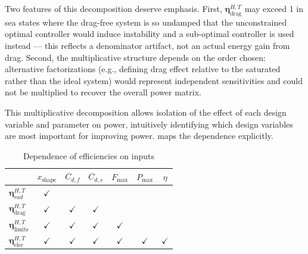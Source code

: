 \documentclass[a4paper,fleqn,colorlinks,unicode,lineno]{cas-dc} %
\makeatletter
\providecommand{\DIFaddtex}[1]{{\protect\color{blue}\uwave{#1}}} %
\providecommand{\DIFdeltex}[1]{{\protect\color{red}\sout{#1}}} %
\providecommand{\DIFaddFL}[1]{\DIFadd{#1}} %
\providecommand{\DIFdelFL}[1]{\DIFdel{#1}} %
\providecommand{\DIFaddbeginFL}{} %
\providecommand{\DIFaddendFL}{} %
\providecommand{\DIFdelbeginFL}{} %
\providecommand{\DIFdelendFL}{} %
\providecommand{\DIFadd}[1]{\texorpdfstring{\DIFaddtex{#1}}{#1}} %
\providecommand{\DIFdel}[1]{\texorpdfstring{\DIFdeltex{#1}}{}} %
\providecommand{\DIFscaledelfig}{0.5}
\newlength{\DIFdelgraphicswidth} %
\newlength{\DIFdelgraphicsheight} %
\providecommand{\DIFaddincludegraphics}[2][]{{\color{blue}\fbox{\DIFOincludegraphics[#1]{#2}}}} %
\providecommand{\DIFdelincludegraphics}[2][]{%
\sbox{\DIFdelgraphicsbox}{\DIFOincludegraphics[#1]{#2}}%
\settoboxwidth{\DIFdelgraphicswidth}{\DIFdelgraphicsbox} %
\settoboxtotalheight{\DIFdelgraphicsheight}{\DIFdelgraphicsbox} %
\scalebox{\DIFscaledelfig}{%
\parbox[b]{\DIFdelgraphicswidth}{\usebox{\DIFdelgraphicsbox}\\[-\baselineskip] \rule{\DIFdelgraphicswidth}{0em}}\llap{\resizebox{\DIFdelgraphicswidth}{\DIFdelgraphicsheight}{%
\setlength{\unitlength}{\DIFdelgraphicswidth}%
\begin{picture}(1,1)%
\thicklines\linethickness{2pt} %
{\color[rgb]{1,0,0}\put(0,0){\framebox(1,1){}}}%
{\color[rgb]{1,0,0}\put(0,0){\line( 1,1){1}}}%
{\color[rgb]{1,0,0}\put(0,1){\line(1,-1){1}}}%
\end{picture}%
}\hspace*{3pt}}} %
} %
\DeclareRobustCommand{\DIFaddbeginFL}{\DIFOaddbeginFL \let\includegraphics\DIFaddincludegraphics} %
\DeclareRobustCommand{\DIFaddendFL}{\DIFOaddendFL \let\includegraphics\DIFOincludegraphics} %
\DeclareRobustCommand{\DIFdelbeginFL}{\DIFOdelbeginFL \let\includegraphics\DIFdelincludegraphics} %
\DeclareRobustCommand{\DIFdelendFL}{\DIFOaddendFL \let\includegraphics\DIFOincludegraphics} %
\let\sout@orig\sout %
\renewcommand{\sout}[1]{\ifmmode\text{\sout@orig{\ensuremath{#1}}}\else\sout@orig{#1}\fi} %
\makeatother
\begin{document}
\ifdefined\DISSERTATION
    Two features of this decomposition deserve emphasis.
    First, $\mathbf{\eta}^{H,T}_{\text{drag}}$ may exceed 1 in sea states where the drag-free system is so undamped that the unconstrained optimal controller would induce instability and a sub-optimal controller is used instead --- this reflects a denominator artifact, not an actual energy gain from drag.
    Second, the multiplicative structure depends on the order chosen: alternative factorizations (e.g., defining drag effect relative to the saturated rather than the ideal system) would represent independent sensitivities and could not be multiplied to recover the overall power matrix.
\fi


This multiplicative decomposition allows isolation of the effect of each design variable and parameter on power, intuitively identifying which design variables are most important for improving power.
 maps the dependence explicitly.
{
\renewcommand{\arraystretch}{1.35}
\begin{table}[h]
\centering
\caption{Dependence of efficiencies on inputs}\label{tab:power-matrix-dependence}
\begin{tabular}{lcccccc}
\hline
 & $x_{\text{shape}}$ & \DIFdelbeginFL \DIFdelFL{$C_{d,f}$ }\DIFdelendFL \DIFaddbeginFL \DIFaddFL{$\gls{sym-C-d-f}$ }\DIFaddendFL & \DIFdelbeginFL \DIFdelFL{$C_{d,s}$ }\DIFdelendFL \DIFaddbeginFL \DIFaddFL{$\gls{sym-C-d-s}$ }\DIFaddendFL & \DIFdelbeginFL \DIFdelFL{$F_{\text{max}}$ }\DIFdelendFL \DIFaddbeginFL \DIFaddFL{$\gls{sym-F-max}$ }\DIFaddendFL & \DIFdelbeginFL \DIFdelFL{$P_{\text{max}}$ }\DIFdelendFL \DIFaddbeginFL \DIFaddFL{$\gls{sym-P-max}$ }\DIFaddendFL & \DIFdelbeginFL \DIFdelFL{$\eta$ }\DIFdelendFL \DIFaddbeginFL \DIFaddFL{$\gls{sym-eta}$ }\DIFaddendFL \\
\hline
\DIFdelbeginFL \DIFdelFL{$\mathbf{\eta}^{H,T}_{rad}$   }\DIFdelendFL \DIFaddbeginFL \DIFaddFL{$\gls{sym-boldsymbol-eta-H-T-rad}$   }\DIFaddendFL & $\checkmark$ &  &  &  &  &  \\
\DIFdelbeginFL \DIFdelFL{$\mathbf{\eta}^{H,T}_{\text{drag}}$  }\DIFdelendFL \DIFaddbeginFL \DIFaddFL{$\gls{sym-boldsymbol-eta-H-T-drag}$  }\DIFaddendFL & $\checkmark$ & $\checkmark$ & $\checkmark$ &  &  &  \\
\DIFdelbeginFL \DIFdelFL{$\mathbf{\eta}^{H,T}_{\text{limits}}$ }\DIFdelendFL \DIFaddbeginFL \DIFaddFL{$\gls{sym-boldsymbol-eta-H-T-limits}$ }\DIFaddendFL & $\checkmark$ & $\checkmark$ & $\checkmark$ & $\checkmark$ &  &  \\
\DIFdelbeginFL \DIFdelFL{$\mathbf{\eta}^{H,T}_{\text{elec}}$  }\DIFdelendFL \DIFaddbeginFL \DIFaddFL{$\gls{sym-boldsymbol-eta-H-T-elec}$  }\DIFaddendFL & $\checkmark$ & $\checkmark$ & $\checkmark$ & $\checkmark$ & $\checkmark$ & $\checkmark$ \\
\hline
\end{tabular}
\end{table}
}
\end{document}
